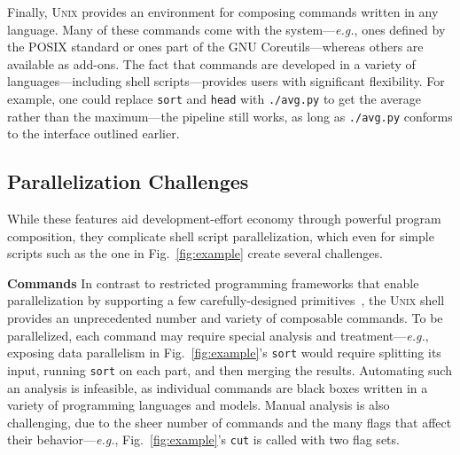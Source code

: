 \documentclass[sigplan, review, screen, anonymous]{acmart}
\newcommand{\eg}{{\em e.g.}, }
\newcommand{\heading}[1]{\vspace{4pt}\noindent\textbf{#1}\enspace}
\newcommand{\ttt}[1]{\texttt{#1}}
\newcommand{\sx}[1]{(\S\ref{#1})}
\newcommand{\unix}{{\scshape Unix}\xspace}
\begin{document}
Finally, \unix provides an environment for composing commands written in any language.
Many of these commands come with the system---\eg ones defined by the POSIX standard or ones part of the GNU Coreutils---whereas others are available as add-ons.
The fact that commands are developed in a variety of languages---including shell scripts---provides users with significant flexibility.
For example, one could replace \ttt{sort} and \ttt{head} with \ttt{./avg.py} to get the average rather than the maximum---the pipeline still works, as long as \ttt{./avg.py} conforms to the interface outlined earlier.




\subsection{Parallelization Challenges}
\label{bg:challenges}

While these features aid development-effort economy through powerful program composition, they complicate shell script parallelization, which even for simple scripts such as the one in Fig.~\ref{fig:example} create
several challenges.

\heading{Commands} %
In contrast to restricted programming frameworks that enable parallelization by supporting a few carefully-designed primitives~\cite{streamit:02, brook:04, mapreduce:08, spark:12}, the \unix shell provides an unprecedented number and variety of composable commands.
To be parallelized, each command may require special analysis and treatment---\eg exposing data parallelism in Fig.~\ref{fig:example}'s \ttt{sort} would require splitting its input, running \ttt{sort} on each part, and then merging the results.
Automating such an analysis is infeasible, as individual commands are black boxes written in a variety of programming languages and models.
Manual analysis is also challenging, due to the sheer number of commands and the many flags that affect their behavior---\eg Fig.~\ref{fig:example}'s \ttt{cut} is called with two flag sets.
\end{document}
